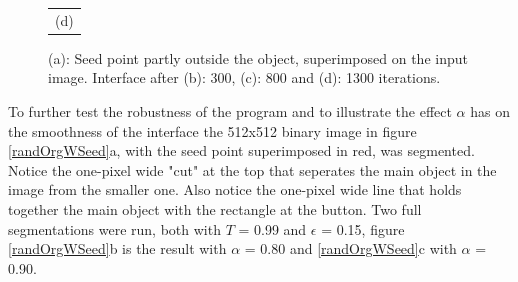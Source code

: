 \begin{figure}[h!]
\begin{minipage}{.49\textwidth}
\begin{tabular}{c}
(d)
\end{tabular}
\end{minipage}
\caption{(a): Seed point partly outside the object, superimposed on the input image. Interface after (b): 300, (c): 800 and (d): 1300 iterations.}
\label{circleSeedPartlyOutside}
\end{figure}

To further test the robustness of the program and to illustrate the effect $\alpha$ has on the smoothness of the interface the 512x512 binary image in figure \ref{randOrgWSeed}a, with the seed point superimposed in red, was segmented. Notice the one-pixel wide "cut" at the top that seperates the main object in the image from the smaller one. Also notice the one-pixel wide line that holds together the main object with the rectangle at the button. Two full segmentations were run, both with $T$ = 0.99 and $\epsilon$ = 0.15, figure \ref{randOrgWSeed}b is the result with $\alpha$ = 0.80 and \ref{randOrgWSeed}c with $\alpha$ = 0.90.
